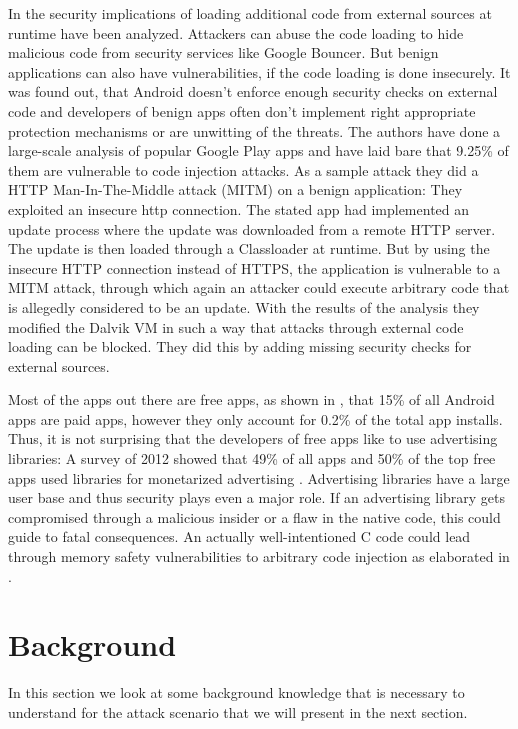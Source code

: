In \cite{ExecuteThis} the security implications of loading additional code from external sources at runtime have been analyzed. Attackers can abuse the code loading to hide malicious code from security services like Google Bouncer. But benign applications can also have vulnerabilities, if the code loading is done insecurely. It was found out, that Android doesn't enforce enough security checks on external code and developers of benign apps often don't implement right appropriate protection mechanisms or are unwitting of the threats. The authors have done a large-scale analysis of popular Google Play apps and have laid bare that 9.25\% of them are vulnerable to code injection attacks. As a sample attack they did a HTTP Man-In-The-Middle attack (MITM) on a benign application:
They exploited an insecure http connection. The stated app had implemented an update process where the update was downloaded from a remote HTTP server. The update is then loaded through a Classloader at runtime. But by using the insecure HTTP connection instead of HTTPS, the application is vulnerable to a MITM attack, through which again an attacker could execute arbitrary code that is allegedly considered to be an update.
With the results of the analysis they modified the Dalvik VM in such a way that attacks through external code loading can be blocked. They did this by adding missing security checks for external sources.

Most of the apps out there are free apps, as shown in \cite[p. 164]{Wang:2017:ESM:3038912.3052712}, that 15\% of all Android apps are paid apps, however they only account for 0.2\% of the total app installs. 
Thus, it is not surprising that the developers of free apps like to use advertising libraries: A survey of 2012 showed that 49\% of all apps and 50\% of the top free apps used libraries for monetarized advertising \cite[p.7]{Pearce:2012:APS:2414456.2414498}. 
Advertising libraries have a large user base and thus security plays even a major role. 
If an advertising library gets compromised through a malicious insider or a flaw in the native code, this could guide to fatal consequences. 
An actually well-intentioned C code could lead through memory safety vulnerabilities to arbitrary code injection as elaborated in \cite{Szekeres:2013:SEW:2497621.2498101}.

\section{Background}

In this section we look at some background knowledge that is necessary to understand for the attack scenario that we will present in the next section.
 
